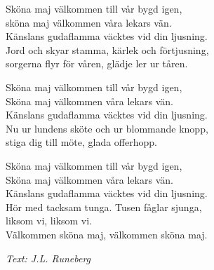 \vspace{10pt}
Sköna maj välkommen till vår bygd igen,\\
sköna maj välkommen våra lekars vän.\\
Känslans gudaflamma väcktes vid din ljusning.\\
Jord och skyar stamma, kärlek och förtjusning,\\
sorgerna flyr för våren, glädje ler ur tåren.\par
\vspace{10pt}
Sköna maj välkommen till vår bygd igen,\\
Sköna maj välkommen våra lekars vän.\\
Känslans gudaflamma väcktes vid din ljusning.\\
Nu ur lundens sköte och ur blommande knopp,\\
stiga dig till möte, glada offerhopp.\par
\vspace{10pt}
Sköna maj välkommen till vår bygd igen,\\
Sköna maj välkommen våra lekars vän.\\
Känslans gudaflamma väcktes vid din ljusning.\\
Hör med tacksam tunga. Tusen fåglar sjunga,\\
liksom vi, liksom vi.\\
Välkommen sköna maj, välkommen sköna maj.\par
\vspace{10pt}
{\footnotesize\textit{Text: J.L. Runeberg}}
